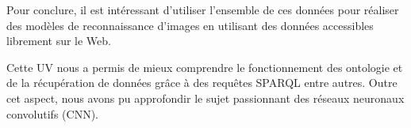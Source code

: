 

Pour conclure, il est intéressant d'utiliser l'ensemble de ces données pour réaliser des modèles de reconnaissance d'images en utilisant des données accessibles librement sur le Web.




Cette UV nous a permis de mieux comprendre le fonctionnement des ontologie et de la récupération de données grâce à des requêtes SPARQL entre autres.
Outre cet aspect, nous avons pu approfondir le sujet passionnant des réseaux neuronaux convolutifs (CNN).
